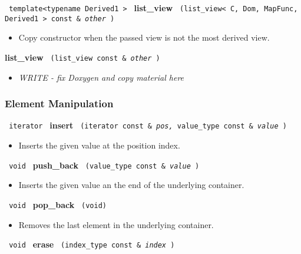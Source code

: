 \noindent
\texttt{%
template<typename Derived1 >
}
\newline
\textbf{list\_view}%
\texttt{%
(list\_view< C, Dom, MapFunc, Derived1 > const \&
\textit{other}%
)
}

\begin{itemize}
\item
Copy constructor when the passed view is not the most derived view.
\end{itemize}

\noindent
\textbf{list\_view}%
\texttt{%
(list\_view const \&
\textit{other}%
)
}

\begin{itemize}
\item
\textit{WRITE - fix Doxygen and copy material here}
\end{itemize}

\subsubsection{ Element Manipulation}

\noindent
\texttt{%
iterator
}
\newline
\textbf{insert}%
\texttt{%
(iterator const \&
\textit{pos,}%
value\_type const \&
\textit{value}%
)
}

\begin{itemize}
\item
Inserts the given value at the position index.
\end{itemize}

\noindent
\texttt{%
void
}
\newline
\textbf{push\_back}%
\texttt{%
(value\_type const \&
\textit{value}%
)
}

\begin{itemize}
\item
Inserts the given value an the end of the underlying container.
\end{itemize}

\noindent
\texttt{%
void
}
\newline
\textbf{pop\_back}%
\texttt{%
(void)
}

\begin{itemize}
\item
Removes the last element in the underlying container.
\end{itemize}

\noindent
\texttt{%
void
}
\newline
\textbf{erase}%
\texttt{%
(index\_type const \&
\textit{index}%
)
}

